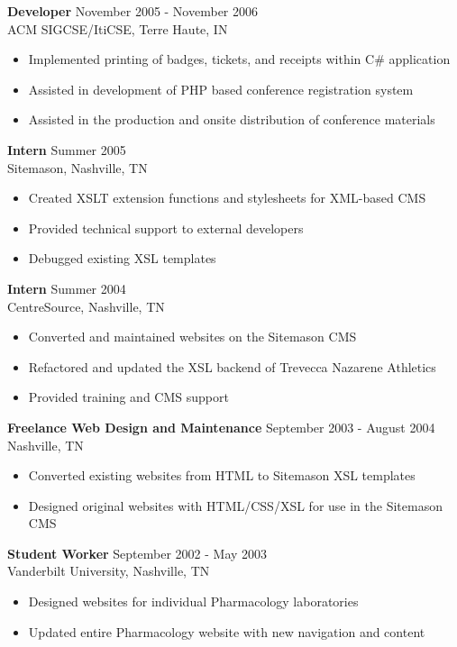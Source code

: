 \documentclass[line, margin, 10pt]{res}
\begin{document}
\begin{resume}
\pagebreak
{\bf Developer} \hfill November 2005 - November 2006\\
ACM SIGCSE/ItiCSE, Terre Haute, IN\nopagebreak[4]
\begin{itemize} \itemsep -2pt
\item Implemented printing of badges, tickets, and receipts within C\# application
\item Assisted in development of PHP based conference registration system
\item Assisted in the production and onsite distribution of conference materials
\end{itemize}

{\bf Intern} \hfill Summer 2005\\
Sitemason, Nashville, TN
\begin{itemize} \itemsep -2pt
\item Created XSLT extension functions and stylesheets for XML-based CMS
\item Provided technical support to external developers
\item Debugged existing XSL templates
\end{itemize}

{\bf Intern} \hfill Summer 2004\\
CentreSource, Nashville, TN
\begin{itemize} \itemsep -2pt
\item Converted and maintained websites on the Sitemason CMS
\item Refactored and updated the XSL backend of Trevecca Nazarene Athletics
\item Provided training and CMS support
\end{itemize}

{\bf Freelance Web Design and Maintenance} \hfill September 2003 - August 2004\\
Nashville, TN
\begin{itemize} \itemsep -2pt
\item Converted existing websites from HTML to Sitemason XSL templates
\item Designed original websites with HTML/CSS/XSL for use in the Sitemason CMS
\end{itemize}

{\bf Student Worker} \hfill September 2002 - May 2003\\
Vanderbilt University, Nashville, TN
\begin{itemize} \itemsep -2pt
\item Designed websites for individual Pharmacology laboratories
\item Updated entire Pharmacology website with new navigation and content
\end{itemize}



\end{resume}
\end{document}
